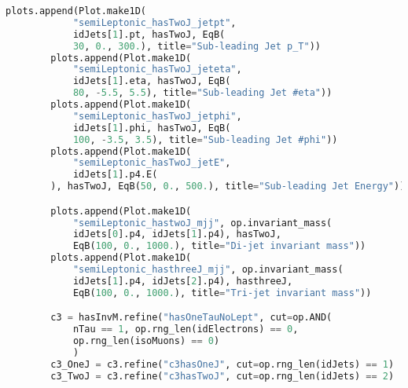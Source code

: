 \begin{lstlisting}[language=Python, caption=Python module of the analysis used in Bamboo framework, label={bamboocode}]
        plots.append(Plot.make1D(
            "semiLeptonic_hasTwoJ_jetpt",
            idJets[1].pt, hasTwoJ, EqB(
            30, 0., 300.), title="Sub-leading Jet p_T"))
        plots.append(Plot.make1D(
            "semiLeptonic_hasTwoJ_jeteta",
            idJets[1].eta, hasTwoJ, EqB(
            80, -5.5, 5.5), title="Sub-leading Jet #eta"))
        plots.append(Plot.make1D(
            "semiLeptonic_hasTwoJ_jetphi",
            idJets[1].phi, hasTwoJ, EqB(
            100, -3.5, 3.5), title="Sub-leading Jet #phi"))
        plots.append(Plot.make1D(
            "semiLeptonic_hasTwoJ_jetE",
            idJets[1].p4.E(
        ), hasTwoJ, EqB(50, 0., 500.), title="Sub-leading Jet Energy"))

        plots.append(Plot.make1D(
            "semiLeptonic_hastwoJ_mjj", op.invariant_mass(
            idJets[0].p4, idJets[1].p4), hasTwoJ,
            EqB(100, 0., 1000.), title="Di-jet invariant mass"))
        plots.append(Plot.make1D(
            "semiLeptonic_hasthreeJ_mjj", op.invariant_mass(
            idJets[1].p4, idJets[2].p4), hasthreeJ,
            EqB(100, 0., 1000.), title="Tri-jet invariant mass"))

        c3 = hasInvM.refine("hasOneTauNoLept", cut=op.AND(
            nTau == 1, op.rng_len(idElectrons) == 0,
            op.rng_len(isoMuons) == 0)
            )
        c3_OneJ = c3.refine("c3hasOneJ", cut=op.rng_len(idJets) == 1)
        c3_TwoJ = c3.refine("c3hasTwoJ", cut=op.rng_len(idJets) == 2)


\end{lstlisting}

